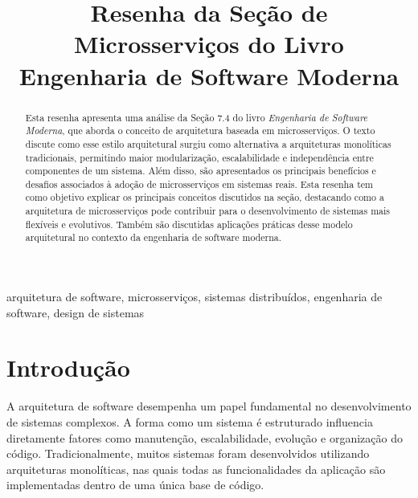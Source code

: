 \documentclass[conference]{IEEEtran}
\begin{document}
\title{Resenha da Seção de Microsserviços do Livro Engenharia de Software Moderna}

\author{
}

\maketitle

\begin{abstract}

Esta resenha apresenta uma análise da Seção 7.4 do livro \textit{Engenharia de Software Moderna}, que aborda o conceito de arquitetura baseada em microsserviços. O texto discute como esse estilo arquitetural surgiu como alternativa a arquiteturas monolíticas tradicionais, permitindo maior modularização, escalabilidade e independência entre componentes de um sistema. Além disso, são apresentados os principais benefícios e desafios associados à adoção de microsserviços em sistemas reais. Esta resenha tem como objetivo explicar os principais conceitos discutidos na seção, destacando como a arquitetura de microsserviços pode contribuir para o desenvolvimento de sistemas mais flexíveis e evolutivos. Também são discutidas aplicações práticas desse modelo arquitetural no contexto da engenharia de software moderna.

\end{abstract}

\begin{IEEEkeywords}
arquitetura de software, microsserviços, sistemas distribuídos, engenharia de software, design de sistemas
\end{IEEEkeywords}

\section{Introdução}

A arquitetura de software desempenha um papel fundamental no desenvolvimento de sistemas complexos. A forma como um sistema é estruturado influencia diretamente fatores como manutenção, escalabilidade, evolução e organização do código. Tradicionalmente, muitos sistemas foram desenvolvidos utilizando arquiteturas monolíticas, nas quais todas as funcionalidades da aplicação são implementadas dentro de uma única base de código.
\end{document}
